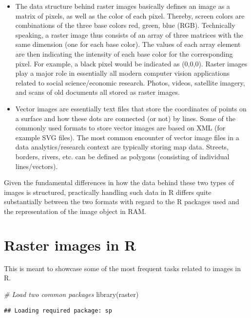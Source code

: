 \documentclass[
  12pt,
]{style/krantz}
\newenvironment{Shaded}{\begin{snugshade}}{\end{snugshade}}
\newcommand{\CommentTok}[1]{\textcolor[rgb]{0.56,0.35,0.01}{\textit{#1}}}
\newcommand{\FunctionTok}[1]{\textcolor[rgb]{0.00,0.00,0.00}{#1}}
\newcommand{\NormalTok}[1]{#1}
\begin{document}
\begin{itemize}
\item
  The data structure behind raster images basically defines an image as a matrix of pixels, as well as the color of each pixel. Thereby, screen colors are combinations of the three base colors red, green, blue (RGB). Technically speaking, a raster image thus consists of an array of three matrices with the same dimension (one for each base color). The values of each array element are then indicating the intensity of each base color for the corresponding pixel. For example, a black pixel would be indicated as (0,0,0). Raster images play a major role in essentially all modern computer vision applications related to social science/economic research. Photos, videos, satellite imagery, and scans of old documents all stored as raster images.
\item
  Vector images are essentially text files that store the coordinates of points on a surface and how these dots are connected (or not) by lines. Some of the commonly used formats to store vector images are based on XML (for example SVG files). The most common encounter of vector image files in a data analytics/research context are typically storing map data. Streets, borders, rivers, etc. can be defined as polygons (consisting of individual lines/vectors).
\end{itemize}

Given the fundamental differences in how the data behind these two types of images is structured, practically handling such data in R differs quite substantially between the two formats with regard to the R packages used and the representation of the image object in RAM.

\hypertarget{raster-images-in-r}{%
\section{Raster images in R}\label{raster-images-in-r}}

This is meant to showcase some of the most frequent tasks related to images in R.

\begin{Shaded}
\begin{Highlighting}[]
\CommentTok{\# Load two common packages}
\FunctionTok{library}\NormalTok{(raster) }
\end{Highlighting}
\end{Shaded}

\begin{verbatim}
## Loading required package: sp
\end{verbatim}
\end{document}
